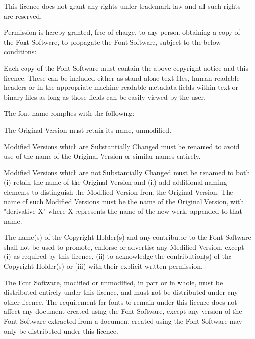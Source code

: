 This licence does not grant any rights under trademark law and all such rights are reserved.

Permission is hereby granted, free of charge, to any person obtaining a copy of the Font Software, to propagate the Font Software, subject to the below conditions:

\startitemize[n]
\item
Each copy of the Font Software must contain the above copyright notice and this licence. These can be included either as stand-alone text files, human-readable headers or in the appropriate machine-readable metadata fields within text or binary files as long as those fields can be easily viewed by the user.

\item
The font name complies with the following:
    
    \startitemize[a]
    \item The Original Version must retain its name, unmodified.
    
    \item Modified Versions which are Substantially Changed must be renamed to avoid use of the name of the Original Version or similar names entirely.
    
    \item Modified Versions which are not Substantially Changed must be renamed to both (i) retain the name of the Original Version and (ii) add additional naming elements to distinguish the Modified Version from the Original Version. The name of such Modified Versions must be the name of the Original Version, with "derivative X" where X represents the name of the new work, appended to that name.
    \stopitemize

\item
The name(s) of the Copyright Holder(s) and any contributor to the Font Software shall not be used to promote, endorse or advertise any Modified Version, except (i) as required by this licence, (ii) to acknowledge the contribution(s) of the Copyright Holder(s) or (iii) with their explicit written permission.

\item
The Font Software, modified or unmodified, in part or in whole, must be distributed entirely under this licence, and must not be distributed under any other licence. The requirement for fonts to remain under this licence does not affect any document created using the Font Software, except any version of the Font Software extracted from a document created using the Font Software may only be distributed under this licence.
\stopitemize

